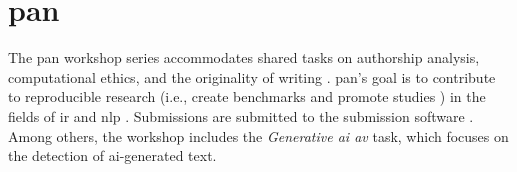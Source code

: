 \section{\acs{pan}}
\label{sec:pan}

The \ac{pan} workshop series accommodates shared tasks %
on authorship analysis, computational ethics, and the originality of writing \citep{ayele_overview_2024}.
\ac{pan}'s goal is to contribute to reproducible research (i.e., create benchmarks and promote studies \citep{kocher_unine_2015}) 
in the fields of \ac{ir} and \ac{nlp} \citep{ayele_overview_2024}.
Submissions are submitted to the submission software \tira{}.
Among others, the workshop includes the \textit{Generative \ac{ai} \ac{av}} task, 
which focuses on the detection of \ac{ai}-generated text.

